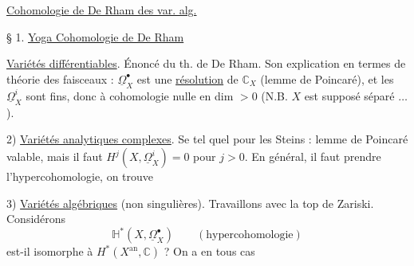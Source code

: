 \uline{Cohomologie de De Rham des var. alg.}


§ 1. \uline{Yoga Cohomologie de De Rham}

 \uline{Variétés différentiables}. Énoncé du th. de De Rham.
Son explication en termes de théorie des faisceaux :
 $\underline\Omega_X^\bullet$ est une \uline{résolution} de $\mathbb C_X$ (lemme de Poincaré), et les $\underline\Omega_X^i$ sont fins, donc à cohomologie nulle en dim $>0$ (N.B. $X$ est supposé séparé $\ldots$).

2) \uline{Variétés analytiques complexes}. Se  tel quel pour les Steins : lemme de Poincaré  valable, mais il faut $H^j(X,\underline\Omega_X^i)=0$ pour $j>0$. En général, il faut prendre l'hypercohomologie, on trouve
\margin{*)}

3) \uline{Variétés algébriques} (non singulières). Travaillons avec la top de Zariski. Considérons
\[
\mathbb H^*(X,\underline\Omega_X^\bullet)
\qquad(\text{hypercohomologie})
\]
est-il isomorphe à $H^*(X^{\mathrm{an}},\mathbb C)$ ? On a en tous cas

